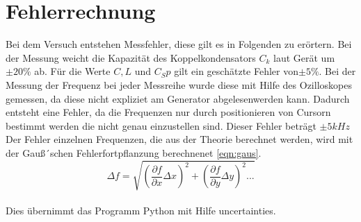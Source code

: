 \section{Fehlerrechnung}
 \label{fehlerrechnung}
Bei dem Versuch entstehen Messfehler,
diese gilt es in Folgenden zu erörtern.
Bei der Messung weicht die Kapazität des Koppelkondensators $C_k$ laut Gerät um $\pm 20 \%$ ab. Für die Werte $C,L $ und $C_Sp$ gilt
ein geschätzte Fehler von$ \pm 5 \% $.
Bei der Messung der Frequenz bei jeder Messreihe
wurde diese mit Hilfe des Ozilloskopes gemessen,
da diese nicht expliziet am Generator abgelesenwerden kann.
Dadurch entsteht eine Fehler, da die Frequenzen
nur durch positionieren von Cursorn bestimmt werden
die nicht genau einzustellen sind. Dieser Fehler beträgt $\pm 5 kHz$
\\
Der Fehler einzelnen Frequenzen, die aus der Theorie berechnet werden, wird mit der Gauß´schen Fehlerfortpflanzung
berechnenet \eqref{eqn:gaus}.
\begin{equation}
\Delta f= \sqrt{\left(\frac{\partial f}{\partial x}\Delta x \right)^{2} + \left( \frac{\partial f}{\partial y}\Delta y\right)^2...}\label{eqn:gaus}
\end{equation}
\\
Dies übernimmt das Programm Python mit Hilfe uncertainties.
